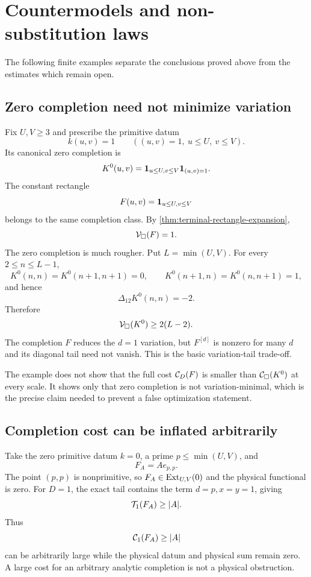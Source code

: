 \section{Countermodels and non-substitution laws}
\label{sec:countermodels}

The following finite examples separate the conclusions proved above from
the estimates which remain open.

\subsection{Zero completion need not minimize variation}

Fix \(U,V\ge3\) and prescribe the primitive datum
\[
 k(u,v)=1
 \qquad
 ((u,v)=1,\ u\le U,\ v\le V).
\]
Its canonical zero completion is
\[
 K^0(u,v)=\mathbf 1_{u\le U,v\le V}\mathbf 1_{(u,v)=1}.
\]
The constant rectangle
\[
 F(u,v)=\mathbf 1_{u\le U,v\le V}
\]
belongs to the same completion class.  By
\cref{thm:terminal-rectangle-expansion},
\[
 \mathcal V_\square(F)=1.
\]
The zero completion is much rougher.  Put \(L=\min(U,V)\).  For every
\(2\le n\le L-1\),
\[
 K^0(n,n)=K^0(n+1,n+1)=0,
 \qquad
 K^0(n+1,n)=K^0(n,n+1)=1,
\]
and hence
\[
 \Delta_{12}K^0(n,n)=-2.
\]
Therefore
\begin{equation}
 \mathcal V_\square(K^0)\ge2(L-2).
 \label{eq:primitive-mask-variation-lower}
\end{equation}
The completion \(F\) reduces the \(d=1\) variation, but
\(F^{[d]}\) is nonzero for many \(d\) and its diagonal tail need not
vanish.  This is the basic variation-tail trade-off.

\begin{remark}
The example does not show that the full cost \(\mathcal C_D(F)\) is smaller than
\(\mathcal C_\square(K^0)\) at every scale.  It shows only that zero completion is not
variation-minimal, which is the precise claim needed to prevent a false
optimization statement.
\end{remark}

\subsection{Completion cost can be inflated arbitrarily}

Take the zero primitive datum \(k=0\), a prime \(p\le\min(U,V)\), and
\[
 F_A=Ae_{p,p}.
\]
The point \((p,p)\) is nonprimitive, so \(F_A\in\operatorname{Ext}_{U,V}(0)\) and the
physical functional is zero.  For \(D=1\), the exact tail contains the
term \(d=p,x=y=1\), giving
\[
 \mathcal T_1(F_A)\ge |A|.
\]
Thus
\[
 \mathcal C_1(F_A)\ge|A|
\]
can be arbitrarily large while the physical datum and physical sum remain
zero.  A large cost for an arbitrary analytic completion is not a physical
obstruction.

